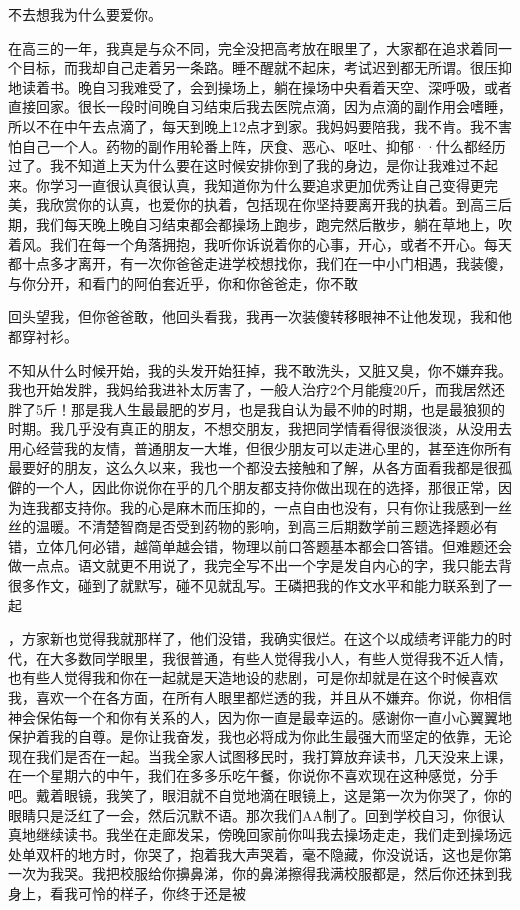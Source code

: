 \documentclass{article}
\begin{document}
\newpage 

不去想我为什么要爱你。

在高三的一年，我真是与众不同，完全没把高考放在眼里了，大家都在追求着同一个目标，而我却自己走着另一条路。睡不醒就不起床，考试迟到都无所谓。很压抑地读着书。晚自习我难受了，会到操场上，躺在操场中央看着天空、深呼吸，或者直接回家。很长一段时间晚自习结束后我去医院点滴，因为点滴的副作用会嗜睡，所以不在中午去点滴了，每天到晚上12点才到家。我妈妈要陪我，我不肯。我不害怕自己一个人。药物的副作用轮番上阵，厌食、恶心、呕吐、抑郁··什么都经历过了。我不知道上天为什么要在这时候安排你到了我的身边，是你让我难过不起来。你学习一直很认真很认真，我知道你为什么要追求更加优秀让自己变得更完美，我欣赏你的认真，也爱你的执着，包括现在你坚持要离开我的执着。到高三后期，我们每天晚上晚自习结束都会都操场上跑步，跑完然后散步，躺在草地上，吹着风。我们在每一个角落拥抱，我听你诉说着你的心事，开心，或者不开心。每天都十点多才离开，有一次你爸爸走进学校想找你，我们在一中小门相遇，我装傻，与你分开，和看门的阿伯套近乎，你和你爸爸走，你不敢

\newpage 

回头望我，但你爸爸敢，他回头看我，我再一次装傻转移眼神不让他发现，我和他都穿衬衫。

不知从什么时候开始，我的头发开始狂掉，我不敢洗头，又脏又臭，你不嫌弃我。我也开始发胖，我妈给我进补太厉害了，一般人治疗2个月能瘦20斤，而我居然还胖了5斤！那是我人生最最肥的岁月，也是我自认为最不帅的时期，也是最狼狈的时期。我几乎没有真正的朋友，不想交朋友，我把同学情看得很淡很淡，从没用去用心经营我的友情，普通朋友一大堆，但很少朋友可以走进心里的，甚至连你所有最要好的朋友，这么久以来，我也一个都没去接触和了解，从各方面看我都是很孤僻的一个人，因此你说你在乎的几个朋友都支持你做出现在的选择，那很正常，因为连我都支持你。我的心是麻木而压抑的，一点自由也没有，只有你让我感到一丝丝的温暖。不清楚智商是否受到药物的影响，到高三后期数学前三题选择题必有错，立体几何必错，越简单越会错，物理以前口答题基本都会口答错。但难题还会做一点点。语文就更不用说了，我完全写不出一个字是发自内心的字，我只能去背很多作文，碰到了就默写，碰不见就乱写。王磷把我的作文水平和能力联系到了一起

\newpage 

，方家新也觉得我就那样了，他们没错，我确实很烂。在这个以成绩考评能力的时代，在大多数同学眼里，我很普通，有些人觉得我小人，有些人觉得我不近人情，也有些人觉得我和你在一起就是天造地设的悲剧，可是你却就是在这个时候喜欢我，喜欢一个在各方面，在所有人眼里都烂透的我，并且从不嫌弃。你说，你相信神会保佑每一个和你有关系的人，因为你一直是最幸运的。感谢你一直小心翼翼地保护着我的自尊。是你让我奋发，我也必将成为你此生最强大而坚定的依靠，无论现在我们是否在一起。当我全家人试图移民时，我打算放弃读书，几天没来上课，在一个星期六的中午，我们在多多乐吃午餐，你说你不喜欢现在这种感觉，分手吧。戴着眼镜，我笑了，眼泪就不自觉地滴在眼镜上，这是第一次为你哭了，你的眼睛只是泛红了一会，然后沉默不语。那次我们AA制了。回到学校自习，你很认真地继续读书。我坐在走廊发呆，傍晚回家前你叫我去操场走走，我们走到操场远处单双杆的地方时，你哭了，抱着我大声哭着，毫不隐藏，你没说话，这也是你第一次为我哭。我把校服给你擤鼻涕，你的鼻涕擦得我满校服都是，然后你还抹到我身上，看我可怜的样子，你终于还是被
\end{document}
